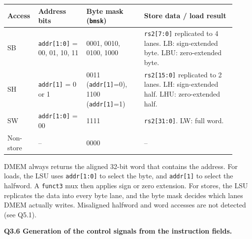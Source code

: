 \documentclass[10pt,a4paper]{article}
\newcommand{\code}[1]{\texttt{#1}}
\begin{document}
\begin{tabular}{@{}p{0.10\linewidth}p{0.20\linewidth}p{0.24\linewidth}p{0.38\linewidth}@{}}
\toprule
\textbf{Access} & \textbf{Address bits} & \textbf{Byte mask (\code{bmsk})} & \textbf{Store data / load result} \\
\midrule
SB & \code{addr[1:0]} = 00, 01, 10, 11 & 0001, 0010, 0100, 1000 & \code{rs2[7:0]} replicated to 4 lanes. LB: sign-extended byte. LBU: zero-extended byte. \\
SH & \code{addr[1]} = 0 or 1 & 0011 (\code{addr[1]}=0), 1100 (\code{addr[1]}=1) & \code{rs2[15:0]} replicated to 2 lanes. LH: sign-extended half. LHU: zero-extended half. \\
SW & \code{addr[1:0]} = 00 & 1111 & \code{rs2[31:0]}. LW: full word. \\
Non-store & -- & 0000 & -- \\
\bottomrule
\end{tabular}

DMEM always returns the aligned 32-bit word that contains the address. For
loads, the LSU uses \code{addr[1:0]} to select the byte, and \code{addr[1]} to
select the halfword. A \code{funct3} mux then applies sign or zero extension.
For stores, the LSU replicates the data into every byte lane, and the byte
mask decides which lanes DMEM actually writes. Misaligned halfword and word
accesses are not detected (see Q5.1).

\textbf{Q3.6 Generation of the control signals from the instruction
fields.}

\begin{center}
\end{center}
\end{document}
